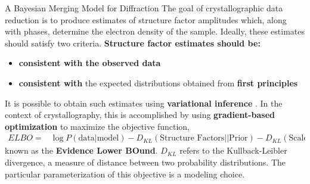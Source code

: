 \documentclass[final]{beamer}
\newlength{\colwidth}
\begin{document}
\begin{frame}[t]
\begin{columns}[t]
\begin{column}{\colwidth}
  \begin{block}{A Bayesian Merging Model for Diffraction}
    The goal of crystallographic data reduction is to produce estimates of structure factor amplitudes which, along with phases, determine the electron density of the sample. Ideally, these estimates should satisfy two criteria. 
    \textbf{Structure factor estimates should be:}
    \begin{itemize}[label=\textbullet,leftmargin=0.05\textwidth, nosep, topsep=0pt]
        \item  \textbf{consistent with the observed data}
        \item \textbf{consistent with} the expected distributions obtained from \textbf{first principles} \cite{wilson_probability_1949}
    \end{itemize}
     It is possible to obtain such estimates using \textbf{variational inference} \cite{blei_variational_2017}. In the context of crystallography, this is accomplished by using \textbf{gradient-based optimization} to maximize the objective function, \cite{dalton_careless_2021}
    \begin{align*}
    ELBO =  
        &\log P(\text{data}|\text{model}) - 
        D_{KL}(\text{Structure Factors} || \text{Prior}) - 
        D_{KL}(\text{Scale Factors} || \text{Prior}) ,
        \label{eq:ELBO}
    \end{align*}
    known as the \textbf{Evidence Lower BOund}. $D_{KL}$ refers to the Kullback-Leibler divergence, a measure of distance between two probability distributions. The particular parameterization of this objective is a modeling choice. 
  \end{block}


\end{column}
\end{columns}
\end{frame}
\end{document}
